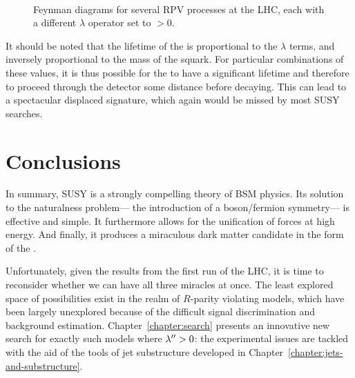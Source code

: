 

\begin{figure}
\centering
{}
\\
\label{fig:susy:rpv_diagrams}
\caption{Feynman diagrams for several RPV processes at the LHC, each with a different $\lambda$ operator set to $>0$.}
\end{figure}


It should be noted that the lifetime of the \lsp is proportional to the $\lambda$ terms, and inversely proportional to the mass of the squark. For particular combinations of these values, it is thus possible for the \lsp to have a significant lifetime and therefore to proceed through the detector some distance before decaying. This can lead to a spectacular displaced signature, which again would be missed by most SUSY searches.  


\section{Conclusions}

In summary, SUSY is a strongly compelling theory of BSM physics. Its solution to the naturalness problem--- the introduction of a boson/fermion symmetry--- is effective and simple. It furthermore allows for the unification of forces at high energy. And finally, it produces a miraculous dark matter candidate in the form of the \lsp.

Unfortunately, given the results from the first run of the LHC, it is time to reconsider whether we can have all three miracles at once. The least explored space of possibilities exist in the realm of $R$-parity violating models, which have been largely unexplored because of the difficult signal discrimination and background estimation. Chapter~\ref{chapter:search} presents an innovative new search for exactly such models where $\lambda^{\prime\prime} > 0$: the experimental issues are tackled with the aid of the tools of jet substructure developed in Chapter~\ref{chapter:jets-and-substructure}.